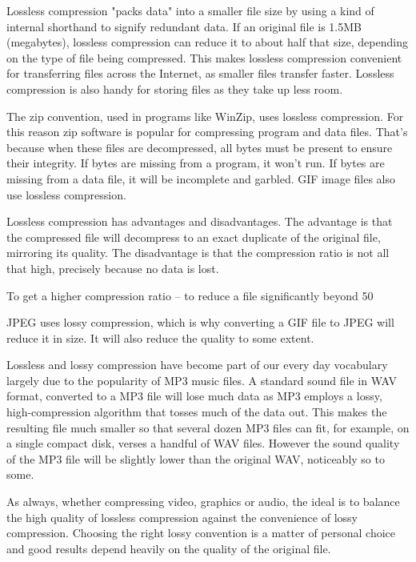Lossless compression "packs data" into a smaller file size by using a kind of internal shorthand to signify redundant data. If an original file is 1.5MB (megabytes), lossless compression can reduce it to about half that size, depending on the type of file being compressed. This makes lossless compression convenient for transferring files across the Internet, as smaller files transfer faster. Lossless compression is also handy for storing files as they take up less room.


The zip convention, used in programs like WinZip, uses lossless compression. For this reason zip software is popular for compressing program and data files. That's because when these files are decompressed, all bytes must be present to ensure their integrity. If bytes are missing from a program, it won't run. If bytes are missing from a data file, it will be incomplete and garbled. GIF image files also use lossless compression.


Lossless compression has advantages and disadvantages. The advantage is that the compressed file will decompress to an exact duplicate of the original file, mirroring its quality. The disadvantage is that the compression ratio is not all that high, precisely because no data is lost.


To get a higher compression ratio -- to reduce a file significantly beyond 50%


JPEG uses lossy compression, which is why converting a GIF file to JPEG will reduce it in size. It will also reduce the quality to some extent.


Lossless and lossy compression have become part of our every day vocabulary largely due to the popularity of MP3 music files. A standard sound file in WAV format, converted to a MP3 file will lose much data as MP3 employs a lossy, high-compression algorithm that tosses much of the data out. This makes the resulting file much smaller so that several dozen MP3 files can fit, for example, on a single compact disk, verses a handful of WAV files. However the sound quality of the MP3 file will be slightly lower than the original WAV, noticeably so to some.


As always, whether compressing video, graphics or audio, the ideal is to balance the high quality of lossless compression against the convenience of lossy compression. Choosing the right lossy convention is a matter of personal choice and good results depend heavily on the quality of the original file.

